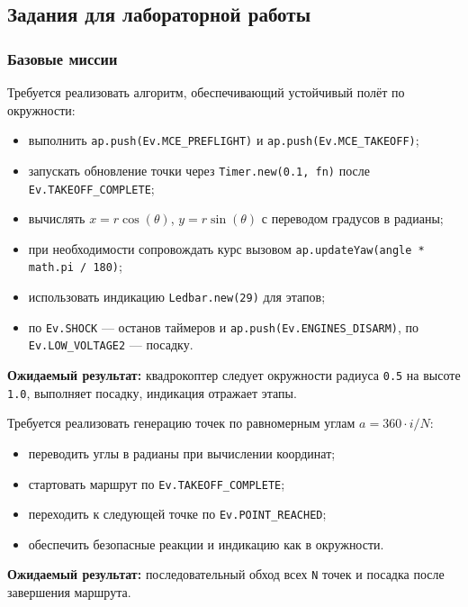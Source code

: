 \subsection{Задания для лабораторной работы}
\subsubsection{Базовые миссии}

\begin{taskbox}[Полёт по окружности радиуса \texttt{r=0.5} на высоте \texttt{z=1.0}]
Требуется реализовать алгоритм, обеспечивающий устойчивый полёт по окружности:
\begin{itemize}
    \item выполнить \texttt{ap.push(Ev.MCE\_PREFLIGHT)} и \texttt{ap.push(Ev.MCE\_TAKEOFF)};
    \item запускать обновление точки через \texttt{Timer.new(0.1, fn)} после \texttt{Ev.TAKEOFF\_COMPLETE};
    \item вычислять \(x = r \cos(\theta)\), \(y = r \sin(\theta)\) с переводом градусов в радианы;
    \item при необходимости сопровождать курс вызовом \texttt{ap.updateYaw(angle * math.pi / 180)};
    \item использовать индикацию \texttt{Ledbar.new(29)} для этапов;
    \item по \texttt{Ev.SHOCK} — останов таймеров и \texttt{ap.push(Ev.ENGINES\_DISARM)}, по \texttt{Ev.LOW\_VOLTAGE2} — посадку.
\end{itemize}

\textbf{Ожидаемый результат:} квадрокоптер следует окружности радиуса \texttt{0.5} на высоте \texttt{1.0}, выполняет посадку, индикация отражает этапы.
\end{taskbox}

\begin{taskbox}
Требуется реализовать генерацию точек по равномерным углам \(a = 360 \cdot i / N\):
\begin{itemize}
    \item переводить углы в радианы при вычислении координат;
    \item стартовать маршрут по \texttt{Ev.TAKEOFF\_COMPLETE};
    \item переходить к следующей точке по \texttt{Ev.POINT\_REACHED};
    \item обеспечить безопасные реакции и индикацию как в окружности.
\end{itemize}

\textbf{Ожидаемый результат:} последовательный обход всех \texttt{N} точек и посадка после завершения маршрута.
\end{taskbox}

